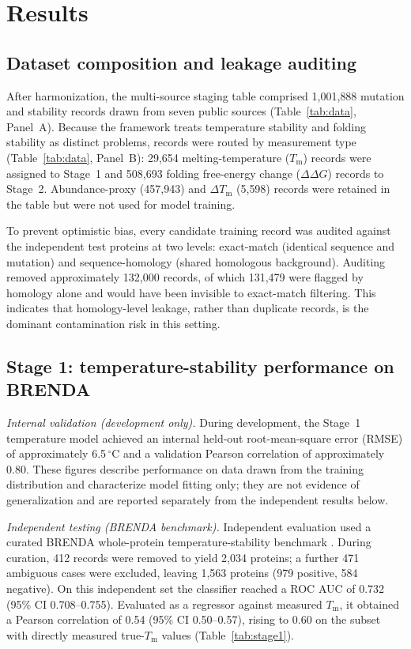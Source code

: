 \documentclass[sn-nature]{sn-jnl}%
\newcommand{\ddg}{\ensuremath{\Delta\Delta G}}
\newcommand{\Tm}{\ensuremath{T_\mathrm{m}}}
\newcommand{\dtm}{\ensuremath{\Delta T_\mathrm{m}}}
\begin{document}
\section{Results}\label{sec:results}

\subsection{Dataset composition and leakage auditing}\label{sec:data}
After harmonization, the multi-source staging table comprised 1{,}001{,}888 mutation and
stability records drawn from seven public sources (Table~\ref{tab:data}, Panel~A). Because
the framework treats temperature stability and folding stability as distinct problems,
records were routed by measurement type (Table~\ref{tab:data}, Panel~B): 29{,}654
melting-temperature (\Tm) records were assigned to Stage~1 and 508{,}693 folding
free-energy change (\ddg) records to Stage~2. Abundance-proxy (457{,}943) and \dtm{}
(5{,}598) records were retained in the table but were not used for model training.

To prevent optimistic bias, every candidate training record was audited against the
independent test proteins at two levels: exact-match (identical sequence and mutation)
and sequence-homology (shared homologous background). Auditing removed approximately
132{,}000 records, of which 131{,}479 were flagged by homology alone and would have been
invisible to exact-match filtering. This indicates that homology-level leakage, rather
than duplicate records, is the dominant contamination risk in this setting.

\subsection{Stage 1: temperature-stability performance on BRENDA}\label{sec:stage1}
\emph{Internal validation (development only).} During development, the Stage~1 temperature
model achieved an internal held-out root-mean-square error (RMSE) of approximately
6.5\,$^{\circ}$C and a validation Pearson correlation of approximately 0.80. These figures
describe performance on data drawn from the training distribution and characterize model
fitting only; they are not evidence of generalization and are reported separately from the
independent results below.

\emph{Independent testing (BRENDA benchmark).} Independent evaluation used a curated BRENDA
whole-protein temperature-stability benchmark \cite{chang2021brenda}. During curation, 412
records were removed to yield 2{,}034 proteins; a further 471 ambiguous cases were
excluded, leaving 1{,}563 proteins (979 positive, 584 negative). On this independent set
the classifier reached a ROC AUC of 0.732 (95\% CI 0.708--0.755). Evaluated as a regressor
against measured \Tm, it obtained a Pearson correlation of 0.54 (95\% CI 0.50--0.57),
rising to 0.60 on the subset with directly measured true-\Tm{} values
(Table~\ref{tab:stage1}).
\end{document}
